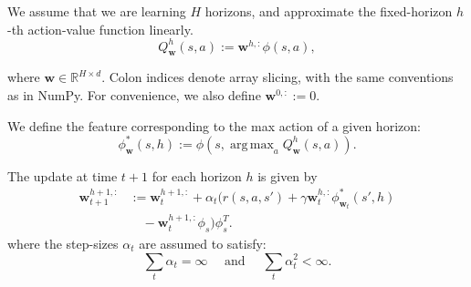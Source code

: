 \documentclass[letterpaper]{article} %
\DeclareMathOperator*{\argmax}{arg\,max}
\newcommand{\R}{\mathbb{R}}
\newcommand{\params}{\mathbf{w}}
\begin{document}



We assume that we are learning $H$ horizons, and approximate the fixed-horizon $h$-th action-value function linearly.
\begin{equation*}
    Q^h_\params(s, a) :=  \params^{h, :} \phi(s, a),
\end{equation*}

\noindent where $\params \in \R^{H \times d}$. Colon indices denote array slicing, with the same conventions as in NumPy. For convenience, we also define $\params^{0, :} := 0$.

We define the feature corresponding to the max action of a given horizon:
\begin{equation*}
    \phi_{\params}^*(s, h) := \phi(s, \argmax_{a} Q^h_\params(s, a)).
\end{equation*}

\noindent The update at time $t + 1$ for each horizon $h$ is given by
\begin{align*}
    \params_{t + 1}^{h + 1, :} &:= \params_t^{h + 1, :} + \alpha_t (r(s, a, s') + \gamma \params_t^{h, :} \phi^*_{\params_t}(s', h) \\
    &\quad - \params_t^{h + 1, :} \phi_s)\phi_s^T.
\end{align*}
\noindent where the step-sizes $\alpha_t$ are assumed to satisfy:
$$
    \sum_{t} \alpha_t = \infty\quad\text{  and  }\quad
    \sum_{t} \alpha_t^2 < \infty.
$$
\end{document}
